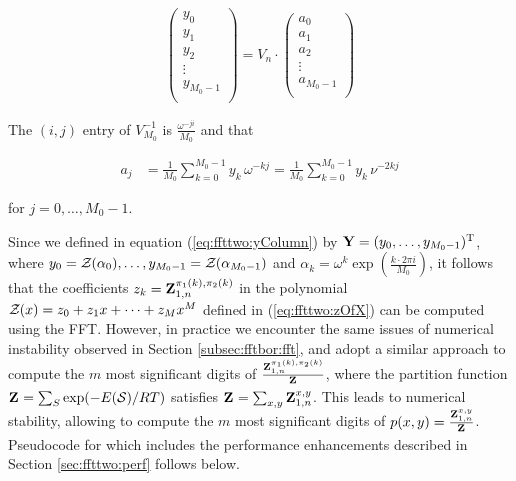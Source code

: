 \begin{align}
\label{eq:ffttwo:dftMatrix}
\left(
\begin{array}{l}
y_0 \\
y_1 \\
y_2 \\
\vdots \\
y_{M_0-1} \\
\end{array}
\right)
= V_n \cdot
\left(
\begin{array}{l}
a_0 \\
a_1 \\
a_2 \\
\vdots \\
a_{M_0-1} \\
\end{array}
\right)
\end{align}

The $(i,j)$ entry of $V_{M_0}^{-1}$ is $\frac{\omega^{-j i}}{M_0}$
and that

\begin{align}
\label{eq:ffttwo:aFromY}
a_j &=\frac{1}{M_0} \sum_{k=0}^{M_0-1} y_k\, \omega^{-kj}
=\frac{1}{M_0} \sum_{k=0}^{M_0-1} y_k\, \nu^{-2kj}
\end{align}

for $j=0,\dots,M_0-1$.

Since we defined \bfY in equation (\ref{eq:ffttwo:yColumn}) by ${\bf Y} =
(y_0,\dots,y_{M_0-1})^{\text T}$, where
$y_0={\mathcal Z}_{}(\alpha_0),\dots,\allowbreak y_{M_0-1}={\mathcal Z}_{}(\alpha_{M_0-1})$
and $\alpha_k = \omega^k
\exp(\frac{k \cdot 2\pi i}{M_0})$,
it follows that the coefficients
$z_k={\bf Z}^{\pi_1(k),\pi_2(k)}_{1,n}$ in the polynomial
${\mathcal Z}_{}(x) = z_0 + z_1 x + \dots + z_{M} x^{M}$ defined in
(\ref{eq:ffttwo:zOfX}) can be computed using the FFT.
However, in practice we encounter the same issues of numerical instability
observed in Section \ref{subsec:fftbor:fft}, and adopt a similar approach
to compute the $m$ most significant
digits of $\frac{{\bf Z}^{\pi_1(k),\pi_2(k)}_{1,n}}{{\bf Z}^{}_{}}$,
where the partition function ${\bf Z}^{}_{} = \sum_{S} \exp(-E(\mathcal S)/RT)$ satisfies
${{\bf Z}^{}_{}} = \sum_{x,y} {\bf Z}^{x,y}_{1,n}$. This leads to numerical stability,
allowing \ffttwo to compute the
$m$ most significant digits of $p(x,y) = \frac{{\bf Z}^{x,y}_{1,n}}{{\bf Z}^{}_{}}$.
Pseudocode for \ffttwo which includes the performance enhancements described in
Section \ref{sec:ffttwo:perf} follows below.
\medskip

